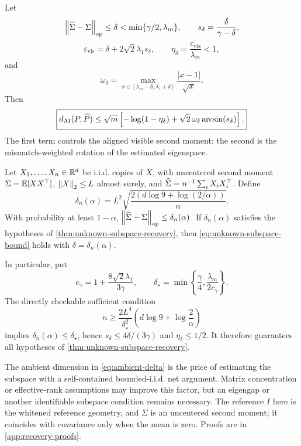 \begin{theorem}
\label{thm:unknown-subspace-recovery}
Let
\[
  \left\lVert \widehat\Sigma-\Sigma\right\rVert_{\operatorname{op}}\le\delta
  <\min\{\gamma/2,\lambda_m\},
  \qquad
  s_\delta=\frac{\delta}{\gamma-\delta},
\]
\[
  \varepsilon_{\mathrm{vis}}
  =\delta+2\sqrt2\lambda_1s_\delta,
  \qquad
  \eta_\delta=\frac{\varepsilon_{\mathrm{vis}}}{\lambda_m}<1,
\]
and
\[
  \omega_\delta
  =\max_{x\in[\lambda_m-\delta,\lambda_1+\delta]}
  \frac{|x-1|}{\sqrt x}.
\]
Then
\begin{equation}
  \boxed{
  d_{\mathrm{AI}}(P,\widehat P)
  \le
  \sqrt m\left[-\log(1-\eta_\delta)
  +\sqrt2\,\omega_\delta\arcsin(s_\delta)\right].}
  \label{eq:unknown-subspace-bound}
\end{equation}
The first term controls the aligned visible second moment; the second is the
mismatch-weighted rotation of the estimated eigenspace.
\end{theorem}

\begin{corollary}
\label{cor:unknown-subspace-sample}
Let \(X_1,\ldots,X_n\in\mathbb R^d\) be i.i.d. copies of \(X\), with uncentered
second moment \(\Sigma=\mathbb E[XX^\top]\), \(\left\lVert X\right\rVert_2\le L\) almost surely,
and
\(\widehat\Sigma=n^{-1}\sum_iX_iX_i^\top\).  Define
\begin{equation}
  \delta_n(\alpha)
  =L^2\sqrt{\frac{2(d\log9+\log(2/\alpha))}{n}}.
  \label{eq:ambient-delta}
\end{equation}
With probability at least \(1-\alpha\),
\(\left\lVert \widehat\Sigma-\Sigma\right\rVert_{\operatorname{op}}\le\delta_n(\alpha)\).  If
\(\delta_n(\alpha)\) satisfies the hypotheses of
\cref{thm:unknown-subspace-recovery}, then
  \eqref{eq:unknown-subspace-bound} holds with
  \(\delta=\delta_n(\alpha)\).

In particular, put
\begin{equation}
  c_\gamma=1+\frac{8\sqrt2\lambda_1}{3\gamma},
  \qquad
  \delta_\star
  =\min\left\{\frac{\gamma}{4},
  \frac{\lambda_m}{2c_\gamma}\right\}.
  \label{eq:explicit-delta-threshold}
\end{equation}
The directly checkable sufficient condition
\begin{equation}
  n\ge
  \frac{2L^4}{\delta_\star^2}
  \left(d\log9+\log\frac{2}{\alpha}\right)
  \label{eq:explicit-unknown-sample-size}
\end{equation}
implies \(\delta_n(\alpha)\le\delta_\star\), hence
\(s_\delta\le4\delta/(3\gamma)\) and
\(\eta_\delta\le1/2\).  It therefore guarantees all hypotheses of
\cref{thm:unknown-subspace-recovery}.
\end{corollary}

The ambient dimension in \eqref{eq:ambient-delta} is the price of estimating
the subspace with a self-contained bounded-i.i.d. net argument.  Matrix
concentration or effective-rank assumptions may improve this factor, but an
eigengap or another identifiable subspace condition remains necessary.  The
reference \(I\) here is the whitened reference geometry, and \(\Sigma\) is an
uncentered second moment; it coincides with covariance only when the mean is
zero.  Proofs are in
\cref{app:recovery-proofs}.
